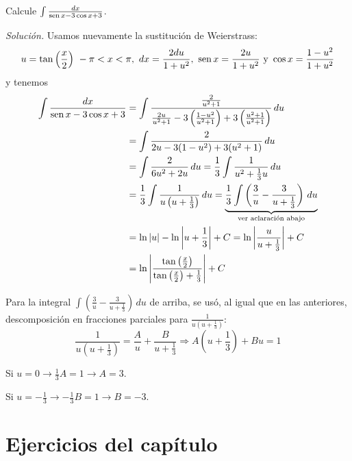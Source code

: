 \begin{ejemplo}
  Calcule $\int \frac{dx}{\operatorname{sen} x-3\cos x+3}$.
\end{ejemplo}
\emph{Solución.} Usamos nuevamente la sustitución de Weierstrass:
\begin{gather*}
  u=\tan \left( \frac{x}{2}\right)\ -\pi<x<\pi,\ dx=\frac{2du}{1+u^{2}},\ \sen x=\frac{2u}{1+u^{2}}\text{ y }\cos x=\frac{1-u^{2}}{1+u^{2}}
\end{gather*}
y tenemos
\begin{align*}
  \int \frac{dx}{\operatorname{sen} x - 3\cos x + 3}
  &= \int \frac{\frac{2}{u^{2}+1}}{\frac{2u}{u^{2}+1}
    - 3\left( \frac{1 - u^{2}}{u^{2}+1} \right)
  + 3\left( \frac{u^{2}+1}{u^{2}+1} \right)} \, du \\
  &= \int \frac{2}{2u - 3(1 - u^{2}) + 3(u^{2} + 1)} \, du \\
  &= \int \frac{2}{6u^{2} + 2u} \, du
  = \frac{1}{3} \int \frac{1}{u^{2} + \frac{1}{3}u} \, du \\
  &= \frac{1}{3} \int \frac{1}{u\left( u + \frac{1}{3} \right)} \, du
  = \underbrace{\frac{1}{3} \int \left( \frac{3}{u}
  - \frac{3}{u + \frac{1}{3}} \right) \, du}_{\text{ver aclaración abajo}} \\
  &= \ln\left| u \right| - \ln\left| u + \frac{1}{3} \right| + C
  = \ln\left| \frac{u}{u + \frac{1}{3}} \right| + C \\
  &= \ln\left| \frac{\tan\left( \frac{x}{2} \right)}{\tan\left( \frac{x}{2} \right) + \frac{1}{3}} \right| + C
\end{align*}

Para la integral $\int \left( \frac{3}{u}-\frac{3}{u+\frac{1}{3}}\right)\, du$ de arriba, se usó, al igual que en las anteriores, descomposición en fracciones parciales para $\frac{1}{u\left( u+\frac{1}{3}\right)}$:
\[
  \frac{1}{u\left( u+\frac{1}{3}\right)}=\frac{A}{u}+\frac{B}{u+\frac{1}{3}}\Rightarrow A\left( u+\frac{1}{3}\right) +Bu=1
\]

Si $u=0\rightarrow \frac{1}{3}A=1\rightarrow A=3$.

Si $u=-\frac{1}{3}\rightarrow -\frac{1}{3}B=1\rightarrow B=-3.$

\section{Ejercicios del capítulo~\thechapter}

\group


